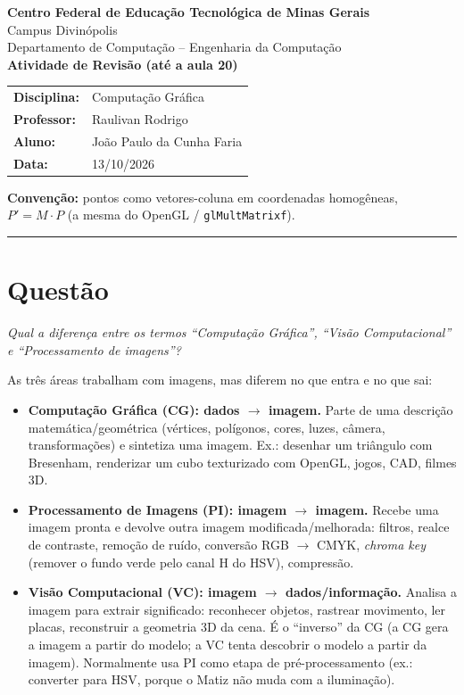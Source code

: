 \documentclass{article}
\newcounter{questao}
\newcommand{\questao}[1]{%
      \stepcounter{questao}%
      \section*{Questão \arabic{questao}}%
      \textit{#1}\par\medskip}
\begin{document}
\begin{center}
      {\large \textbf{Centro Federal de Educação Tecnológica de Minas Gerais}} \\
      Campus Divinópolis \\
      Departamento de Computação -- Engenharia da Computação \\[0.4cm]
      {\Large \textbf{Atividade de Revisão (até a aula 20)}}
\end{center}

\begin{tabular}{@{}ll}
      \textbf{Disciplina:} & Computação Gráfica \\
      \textbf{Professor:}  & Raulivan Rodrigo \\
      \textbf{Aluno:}      & João Paulo da Cunha Faria \\
      \textbf{Data:}       & 13/10/2026 \\
\end{tabular}

\medskip
\textbf{Convenção:} pontos como vetores-coluna em coordenadas homogêneas, $P' = M \cdot P$ (a mesma do OpenGL / \texttt{glMultMatrixf}).

\hrule

\questao{Qual a diferença entre os termos ``Computação Gráfica'', ``Visão Computacional'' e ``Processamento de imagens''?}

As três áreas trabalham com imagens, mas diferem no que entra e no que sai:

\begin{itemize}
      \item \textbf{Computação Gráfica (CG): dados $\rightarrow$ imagem.} Parte de uma descrição matemática/geométrica (vértices, polígonos, cores, luzes, câmera, transformações) e sintetiza uma imagem. Ex.: desenhar um triângulo com Bresenham, renderizar um cubo texturizado com OpenGL, jogos, CAD, filmes 3D.
      \item \textbf{Processamento de Imagens (PI): imagem $\rightarrow$ imagem.} Recebe uma imagem pronta e devolve outra imagem modificada/melhorada: filtros, realce de contraste, remoção de ruído, conversão RGB $\rightarrow$ CMYK, \textit{chroma key} (remover o fundo verde pelo canal H do HSV), compressão.
      \item \textbf{Visão Computacional (VC): imagem $\rightarrow$ dados/informação.} Analisa a imagem para extrair significado: reconhecer objetos, rastrear movimento, ler placas, reconstruir a geometria 3D da cena. É o ``inverso'' da CG (a CG gera a imagem a partir do modelo; a VC tenta descobrir o modelo a partir da imagem). Normalmente usa PI como etapa de pré-processamento (ex.: converter para HSV, porque o Matiz não muda com a iluminação).
\end{itemize}
\end{document}

